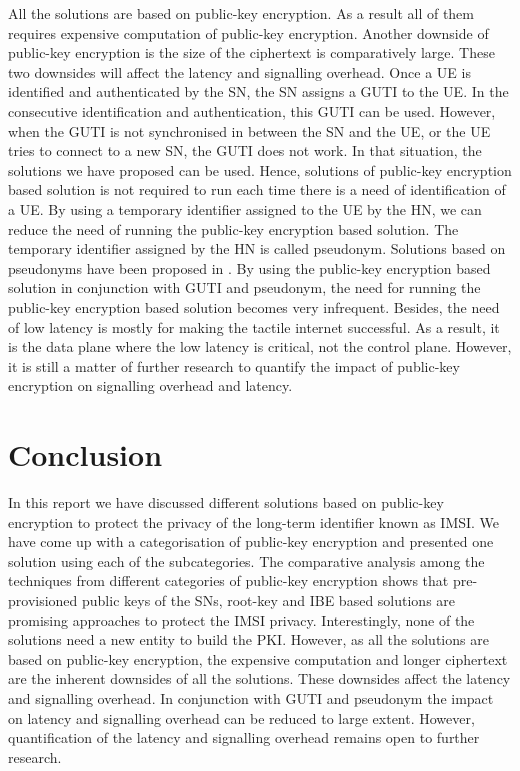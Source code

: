 \documentclass[runningheads,a4paper]{llncs} %
\begin{document}
All the solutions are based on public-key encryption. As a result all of them requires expensive computation of public-key encryption. Another downside of public-key encryption is the size of the ciphertext is comparatively large. These two downsides will affect the latency and signalling overhead. Once a UE is identified and authenticated by the SN, the SN assigns a GUTI to the UE. In the consecutive identification and authentication, this GUTI can be used. However, when the GUTI is not synchronised in between the SN and the UE, or the UE tries to connect to a new SN, the GUTI does not work. In that situation, the solutions we have proposed can be used. Hence, solutions of public-key encryption based solution is not required to run each time there is a need of identification of a UE. By using a temporary identifier assigned to the UE by the HN, we can reduce the need of running the public-key encryption based solution. The temporary identifier assigned by the HN is called pseudonym. Solutions based on pseudonyms have been proposed in \cite{pseudonym_valtteri_philip,pseudonym_ericsson}. By using the public-key encryption based solution in conjunction with GUTI and pseudonym, the need for running the public-key encryption based solution becomes very infrequent. Besides, the need of low latency is mostly for making the tactile internet successful. As a result, it is the data plane where the low latency is critical, not the control plane. However, it is still a matter of further research to quantify the impact of public-key encryption on signalling overhead and latency. 



\section{Conclusion}
\label{sec:conclusion}
In this report we have discussed different solutions based on public-key encryption to protect the privacy of the long-term identifier known as IMSI. We have come up with a categorisation of public-key encryption and presented one solution using each of the subcategories. The comparative analysis among the techniques from different categories of public-key encryption shows that pre-provisioned public keys of the SNs, root-key and IBE based solutions are promising approaches to protect the IMSI privacy.
Interestingly, none of the solutions need a new entity to build the PKI. However, as all the solutions are based on public-key encryption, the expensive computation and longer ciphertext are the inherent downsides of all the solutions. These downsides affect the latency and signalling overhead. In conjunction with GUTI and pseudonym the impact on latency and signalling overhead can be reduced to large extent. However, quantification of the latency and signalling overhead remains open to further research.
\end{document}
